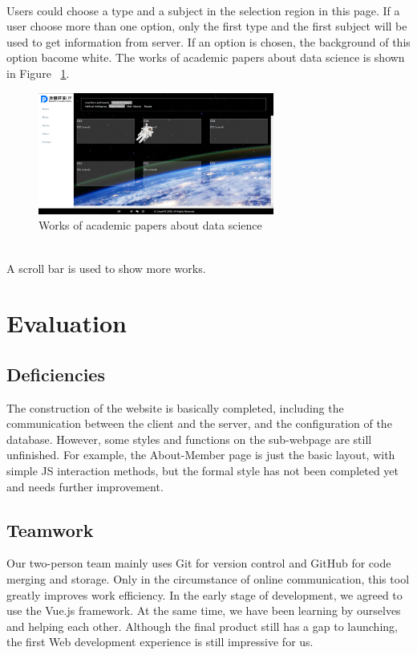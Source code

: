\documentclass{article}
\begin{document}
~\\
\noindent
Users could choose a type and a subject in the selection region in this page.
If a user choose more than one option, only the first type and the first subject
will be used to get information from server. If an option is chosen, the background
of this option bacome white. The works of academic papers about data science is shown
in Figure ~\ref{fig: figure6}.

\begin{figure}[h]
    \centering
    \includegraphics[height=4cm]{img/sectionPNG/Works2.png}
    \caption{Works of academic papers about data science}
    \label{fig: figure6}
\end{figure}

~\\
\noindent
A scroll bar is used to show more works.

\section{Evaluation}
\subsection{Deficiencies}
The construction of the website is basically completed, including 
the communication between the client and the server, and the 
configuration of the database. However, some styles and functions 
on the sub-webpage are still unfinished. For example, the About-Member
page is just the basic layout, with simple JS interaction methods, 
but the formal style has not been completed yet and needs further improvement.
\subsection{Teamwork}
Our two-person team mainly uses Git for version control and 
GitHub for code merging and storage. Only in the circumstance 
of online communication, this tool greatly improves work 
efficiency. In the early stage of development, we agreed 
to use the Vue.js framework. At the same time, we have 
been learning by ourselves and helping each other. 
Although the final product still has a gap to launching, 
the first Web development experience is still impressive for us.
    
\end{document}
